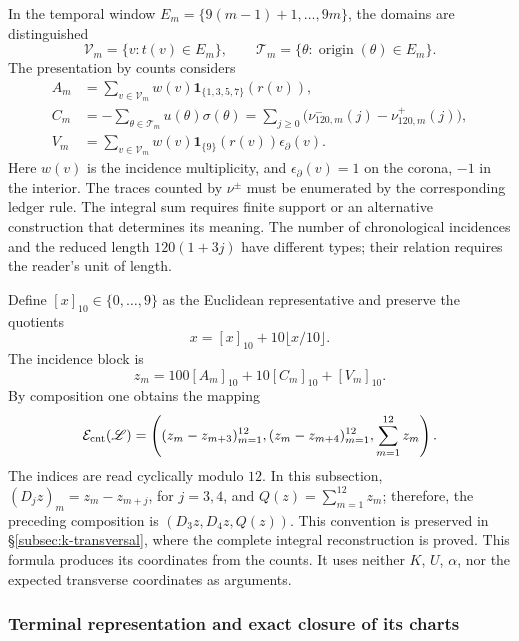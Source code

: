In the temporal window
\(E_m=\{9(m-1)+1,\ldots,9m\}\), the domains are distinguished
\[
 \mathscr V_m=\{v:t(v)\in E_m\},\qquad
 \mathscr T_m=\{\theta:\operatorname{origin}(\theta)\in E_m\}.
\]
The presentation by counts considers
\begin{align}
 A_m&=\sum_{v\in\mathscr V_m}w(v)
             \mathbf1_{\{1,3,5,7\}}(r(v)),\\
 C_m&=-\sum_{\theta\in\mathscr T_m}u(\theta)\sigma(\theta)
      =\sum_{j\geq0}\bigl(\nu^-_{120,m}(j)-\nu^+_{120,m}(j)\bigr),\\
 V_m&=\sum_{v\in\mathscr V_m}w(v)
              \mathbf1_{\{9\}}(r(v))\epsilon_\partial(v).
\end{align}
Here \(w(v)\) is the incidence multiplicity, and
\(\epsilon_\partial(v)=1\) on the corona, \(-1\) in the interior.
The traces counted by \(\nu^\pm\) must be enumerated by the corresponding
ledger rule. The integral sum requires finite support or an alternative
construction that determines its meaning. The number of chronological
incidences and the reduced length \(120(1+3j)\) have different types; their
relation requires the reader's unit of length.

Define \([x]_{10}\in\{0,\ldots,9\}\) as the Euclidean representative and
preserve the quotients
\[
 x=[x]_{10}+10\lfloor x/10\rfloor.
\]
The incidence block is
\begin{equation}
 z_m=100[A_m]_{10}+10[C_m]_{10}+[V_m]_{10}.
 \label{eq:registro-bloque-incidencial}
\end{equation}
By composition one obtains the mapping
\begin{equation}
 \mathcal E_{\rm cnt}(\mathscr L)=
 \left((z_m-z_{m+3})_{m=1}^{12},
       (z_m-z_{m+4})_{m=1}^{12},\sum_{m=1}^{12}z_m\right).
\label{eq:registro-composicion-incidencial}
\end{equation}
The indices are read cyclically modulo \(12\). In this subsection,
\((D_jz)_m=z_m-z_{m+j}\), for \(j=3,4\), and
\(Q(z)=\sum_{m=1}^{12}z_m\); therefore, the preceding composition is
\((D_3z,D_4z,Q(z))\). This convention is preserved in
\S\ref{subsec:k-transversal}, where the complete integral reconstruction is
proved. This formula produces its coordinates from the counts. It uses
neither \(K\), \(U\), \(\alpha\), nor the expected transverse coordinates as
arguments.

\subsubsection{Terminal representation and exact closure of its charts}

